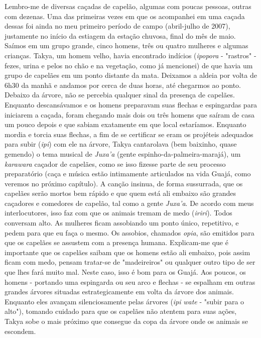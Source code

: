 Lembro-me de diversas caçadas de capelão, algumas com poucas pessoas,
outras com dezenas. Uma das primeiras vezes em que os acompanhei em uma
caçada dessas foi ainda no meu primeiro período de campo (abril-julho de
2007), justamente no início da estiagem da estação chuvosa, final do mês
de maio. Saímos em um grupo grande, cinco homens, três ou quatro
mulheres e algumas crianças. Takya, um homem velho, havia encontrado
indícios (\emph{ipopora} - "rastros" - fezes, urina e pelos no chão e na
vegetação, como já mencionei) de que havia um grupo de capelães em um
ponto distante da mata. Deixamos a aldeia por volta de 6h30 da manhã e
andamos por cerca de duas horas, até chegarmos ao ponto. Debaixo da
árvore, não se percebia qualquer sinal da presença de capelães. Enquanto
descansávamos e os homens preparavam suas flechas e espingardas para
iniciarem a caçada, foram chegando mais dois ou três homens que saíram
de casa um pouco depois e que sabiam exatamente em que local estaríamos.
Enquanto mordia e torcia suas flechas, a fim de se certificar se eram os
projéteis adequados para subir (\emph{ipi}) com ele na árvore, Takya
cantarolava (bem baixinho, quase gemendo) o tema musical de
\emph{Juxa'a} (gente espinho-da-palmeira-marajá), um \emph{karawara}
caçador de capelães, como se isso fizesse parte de seu processo
preparatório (caça e música estão intimamente articulados na vida Guajá,
como veremos no próximo capítulo). A canção insinua, de forma
sussurrada, que os capelães serão mortos bem rápido e que quem está ali
embaixo são grandes caçadores e comedores de capelão, tal como a gente
\emph{Juxa'a}. De acordo com meus interlocutores, isso faz com que os
animais tremam de medo (\emph{iriri}). Todos conversam alto. As mulheres
ficam assobiando um ponto único, repetitivo, e pedem para que eu faça o
mesmo. Os assobios, chamados \emph{opia}, são emitidos para que os
capelães se assustem com a presença humana. Explicam-me que é importante
que os capelães saibam que os homens estão ali embaixo, pois assim ficam
com medo, pensam tratar-se de "madeireiros" ou qualquer outro tipo de
ser que lhes fará muito mal. Neste caso, isso é bom para os Guajá. Aos
poucos, os homens - portando uma espingarda ou seu arco e flechas - se
espalham em outras grandes árvores situadas estrategicamente em volta da
árvore dos animais. Enquanto eles avançam silenciosamente pelas árvores
(\emph{ipi} \emph{wate} - "subir para o alto"), tomando cuidado para que
os capelães não atentem para suas ações, Takya sobe o mais próximo que
consegue da copa da árvore onde os animais se escondem.


